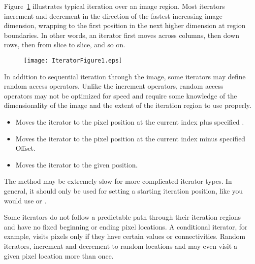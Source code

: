 Figure~\ref{fig:WalkingIterator} illustrates typical iteration over
an image region.  Most iterators increment and decrement in the direction of
the fastest increasing image dimension, wrapping to the first position in the
next higher dimension at region boundaries.  In other words, an
iterator first moves across columns, then down rows, then from slice to slice,
and so on.

\begin{figure}
\centering
\texttt{[image: IteratorFigure1.eps]}
\protect\label{fig:WalkingIterator}
\end{figure}

In addition to sequential iteration through the image, some iterators may define
random access operators.  Unlike the increment operators, random access
operators may not be optimized for speed and require some knowledge of the
dimensionality of the image and the extent of the iteration region to use properly.

\begin{itemize}
\item \textbf{} Moves the iterator to the pixel
position at the current index plus specified .

\item \textbf{} Moves the iterator to 
the pixel position at the current index minus specified Offset.

\item \textbf{} Moves the iterator to the given
 position.
\end{itemize}

The  method may be extremely slow for more complicated
iterator types. In general, it should only be used for setting a starting
iteration position, like you would use  or .

Some iterators do not follow a predictable path through their
iteration regions and have no fixed beginning or ending pixel
locations.  A conditional iterator, for example, visits pixels only if
they have certain values or connectivities.  Random iterators,
increment and decrement to random locations and may even visit a given
pixel location more than once.

